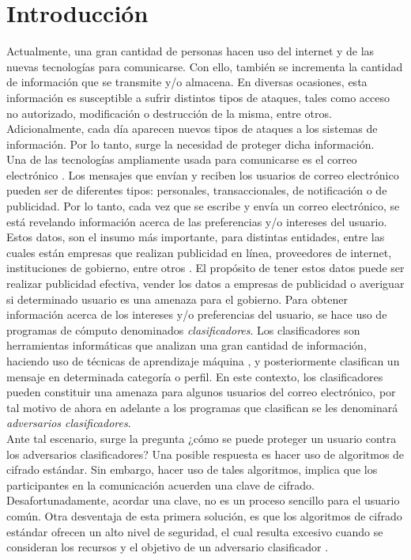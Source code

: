 \documentclass[12pt,oneside,onecolumn,openany]{report}
\begin{document}
\chapter{Introducci\'on}
\label{cha:introduccion}
Actualmente, una gran cantidad de personas hacen uso del internet y de las nuevas tecnologías para comunicarse. Con ello, también se incrementa la cantidad de información que se transmite y/o almacena. En diversas ocasiones, esta información es susceptible a sufrir distintos tipos de ataques, tales como acceso no autorizado, modificación o destrucción de la misma, entre otros. Adicionalmente, cada día aparecen nuevos tipos de ataques a los sistemas de información. Por lo tanto, surge la necesidad de proteger dicha información.\\
Una de las tecnologías ampliamente usada para comunicarse es el correo electrónico \cite{@}. Los mensajes que envían y reciben los usuarios de correo electrónico pueden ser de diferentes tipos: personales, transaccionales, de notificación o de publicidad. Por lo tanto, cada vez que se escribe y envía un correo electrónico, se está revelando información acerca de las preferencias y/o intereses del usuario. Estos datos, son el insumo más importante, para distintas entidades, entre las cuales están empresas que realizan publicidad en línea, proveedores de internet, instituciones de gobierno, entre otros \cite{sp}.
El propósito de tener estos datos puede ser realizar publicidad efectiva, vender los datos a empresas de publicidad o averiguar si determinado usuario es una amenaza para el gobierno. Para obtener información acerca de los intereses y/o preferencias del usuario, se hace uso de programas de cómputo denominados \textit{clasificadores}. Los clasificadores son herramientas informáticas que analizan una gran cantidad de información, haciendo uso de técnicas de aprendizaje máquina \cite{stanford}, y posteriormente clasifican un mensaje en determinada categoría o perfil. 
En este contexto, los clasificadores pueden constituir una amenaza para algunos usuarios del correo electrónico, por tal motivo de ahora en adelante a los programas que clasifican se les denominará \textit{adversarios clasificadores}.\\
Ante tal escenario, surge la pregunta ¿cómo se puede proteger un usuario contra los adversarios clasificadores? Una posible respuesta es hacer uso de algoritmos de cifrado estándar. Sin embargo, hacer uso de tales algoritmos, implica que los participantes en la comunicación acuerden una clave de cifrado. Desafortunadamente, acordar una clave, no es un proceso sencillo para el usuario común. Otra desventaja de esta primera solución, es que los algoritmos de cifrado estándar ofrecen un alto nivel de seguridad, el cual resulta excesivo cuando se consideran los recursos y el objetivo de un adversario clasificador \cite{clas}.
\end{document}
